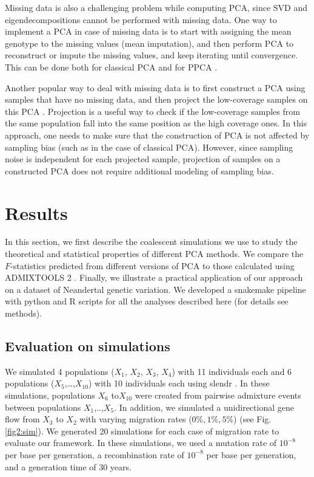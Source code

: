 \documentclass[12pt]{article}
\begin{document}
Missing data is also a challenging problem while computing PCA, since SVD and eigendecompositions cannot be performed with missing data. One way to implement a PCA in case of missing data is to start with assigning the mean genotype to the missing values (mean imputation), and then perform PCA to reconstruct or impute the missing values, and keep iterating until convergence. This can be done both for classical PCA \citep{meisner_large-scale_2021} and for PPCA \citep{tipping_probabilistic_1999-1}.  

Another popular way to deal with missing data is to first construct a PCA using samples that have no missing data, and then project the low-coverage samples on this PCA \citep{patterson_population_2006, price_principal_2006}. Projection is a useful way to check if the low-coverage samples from the same population fall into the same position as the high coverage ones. In this approach, one needs to make sure that the construction of PCA is not affected by sampling bias (such as in the case of classical PCA). However, since sampling noise is independent for each projected sample, projection of samples on a constructed PCA does not require additional modeling of sampling bias. 

\section{Results}
In this section, we first describe the coalescent simulations we use to study the theoretical and statistical properties of different PCA methods. We compare the $F$-statistics predicted from different versions of PCA to those calculated using ADMIXTOOLS 2 \citep{maier_limits_2022}. Finally, we illustrate a practical application of our approach on a dataset of Neandertal genetic variation. We developed a snakemake pipeline \citep{molder_sustainable_2021} with python and R scripts for all the analyses described here (for details see methods).

\subsection{Evaluation on simulations}
We simulated 4 populations ($X_1$, $X_2$, $X_3$, $X_4$) with 11 individuals each and 6 populations ($X_5$,\dots,$X_{10}$) with 10 individuals each using slendr \citep{petr_slendr_2022}. In these simulations, populations $X_6$ to$X_{10}$ were created from pairwise admixture events between populations $X_1$,..,$X_5$. In addition, we simulated a unidirectional gene flow from $X_3$ to $X_2$ with varying migration rates ($0\%, 1\%, 5\%$) (see Fig. \ref{fig2:sim}). We generated 20 simulations for each case of migration rate to evaluate our framework.  In these simulations, we used a mutation rate of $10^{-8}$ per base per generation, a recombination rate of $10^{-8}$ per base per generation, and a generation time of 30 years. 
\end{document}
